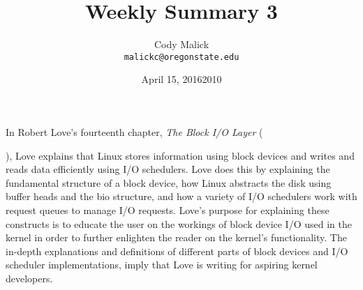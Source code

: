 \documentclass[10pt,letterpaper]{article}
\begin{document}
  \title{Weekly Summary 3}
  \author{Cody Malick\\
  \texttt{malickc@oregonstate.edu}}
  \date{April 15, 2016}
  \maketitle

    In Robert Love's fourteenth chapter, \textit{The Block I/O Layer}
    (\date{2010}), Love explains that Linux stores information using block
    devices and writes and reads data efficiently using I/O schedulers.
    Love does this by explaining the fundamental structure of a block device,
    how Linux abstracts the disk using buffer heads and the bio structure, and
    how a variety of I/O schedulers work with request queues to manage I/O
    requests. Love's purpose for explaining these constructs is to educate the
    user on the workings of block device I/O used in the kernel in order to
    further enlighten the reader on the kernel's functionality.
    The in-depth explanations and definitions of different parts of block
    devices and I/O scheduler implementations, imply that Love is writing for
    aspiring kernel developers.
\end{document}

